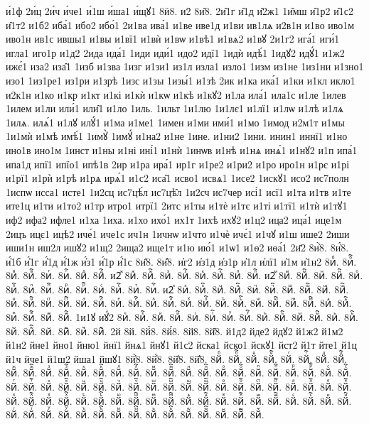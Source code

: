 {и́1ф
2и́ц
2и́ч
и́че1
и́1ш
и́ша1
и́щꙋ1
8ӥ8.
и2̑
8и̑8.
2и̑1г
и̑1д
и̑2ж1
1и̑мш
и̑1р2
и̑1с2
и̑1т2
и1б2
иба́1
ибо2
ибо́1
2и1ва
ива́1
и1ве
иве1д
и1ви
ив1лѧ
и2в1н
и1во
иво1м
иво1н
ив1с
ившы1
и1вы
и1вї1
и1вѝ
и1вѡ
и1вѣ1
и1вѧ2
и1вꙋ
2и1г2
ига́1
иги́1
игла1
иго1р
и1д2
2ида
ида́1
1иди
иди́1
идо2
идї1
1идѝ
идѣ́1
1идꙋ2
идꙋ́1
и1ж2
ижє́1
иза2
иза̑1
1изб
и1зва
1изг
и1зи1
из1л
изла1
изло1
1изм
из1не
1из1ни
и1зно1
изо1
1из1ре1
из1ри
и1зрѣ
1изс
и1зы
1изы́1
и1зѣ
2ик
и1ка
ика́1
и1ки
и1кл
икло1
и2к1н
и1ко
и1кр
и1кт
и1кі
и1кѝ
и1кѡ
и1кѣ
и1кꙋ2
и1ла
ила́1
ила1с
и1ле
1илев
1илем
и1ли
или́1
или̑1
и1ло
1иль.
1ильт
1и1лю
1и1лє1
и1лї1
и1лѡ
и1лѣ
и1лѧ
1илѧ.
илѧ́1
и1лꙋ
илꙋ́1
и1ма
и1ме1
1имен
и1ми
ими́1
и1мо
1имод
и2м1т
и1мы
1и1мѝ
и1мѣ
имѣ́1
1имꙋ̀
1имꙋ́
и1на2
и1не
1ине.
и1ни2
1ини.
инин1
иннї1
и1но
ино1в
ино1м
1инст
и1ны
и1ні
ині́1
и1нѝ
1инѡв
и1нѣ
и1нѧ
инѧ́1
и1нꙋ2
и1п
ипа́1
ипа1д
ипї1
ипїо1
ипѣ1в
2ир
и1ра
ира́1
ир1г
и1ре2
и1ри2
и1ро
иро1н
и1рє
и1рі
и1рї1
и1рѝ
и1рѣ
и1рѧ
ирѧ́1
и1с2
иса̑1
исво1
исвѧ1
1исе2
1искꙋ1
исо2
ис7полн
1испѡ
исса1
исте1
1и2сц
ис7цѣ́л
ис7цѣ̑л
1и2сч
ис7чер
исі́1
исї1
и1та
и1тв
и1те
ите1ц
и1ти
и1то2
и1тр
итро1
итрї1
2итс
и1ты
и1тѐ
и1тє
и1ті
и1тї1
и1тѝ
и1тꙋ1
иф2
ифа2
ифле1
и1ха
1иха.
и1хо
ихо́1
их1т
1ихѣ
ихꙋ2
и1ц2
ица2
ица́1
ице1м
2ицъ
ицє1
ицѣ2
иче́1
иче1с
ич1н
1ичнѡ
и1что
и1чѐ
ичє́1
и1чꙋ
и1ш
ише2
2иши
иши1н
иш2л
ишꙋ2
и1щ2
2ища2
ище1т
и1ю
ию́1
и1ѡ1
и1ѳ2
иѳа́1
2и҃2
8и҆̀8.
8и҆́8.
и҆́1б
и҆́1г
и҆́1д
и҆́1ж
и҆́з1
и҆́1р
и҆́1с
8и҆̈8.
8и҆̑8.
и҆г2
и҆з1д
и҆з1р
и҆1л
и҆лї1
и҆1м
и҆1н2
8иⷠ.
8иⷠ҇.
8иⷡ.
8иⷡ҇.
8иⷢ.
8иⷢ҇.
8иⷣ.
8иⷣ҇.
и2ⷤ
8иⷤ.
8иⷤ҇.
8иⷥ.
8иⷥ҇.
8иⷦ.
8иⷦ҇.
8иⷧ.
8иⷧ҇.
и2ⷨ
8иⷨ.
8иⷨ҇.
8иⷩ.
8иⷩ҇.
8иⷪ.
8иⷪ҇.
8иⷫ.
8иⷫ҇.
8иⷬ.
8иⷬ҇.
8иⷭ.
8иⷭ҇.
8иⷮ.
8иⷮ҇.
и2ⷯ
8иⷯ.
8иⷯ҇.
8иⷰ.
8иⷰ҇.
8иⷱ.
8иⷱ҇.
8иⷲ.
8иⷲ҇.
8иⷳ.
8иⷳ҇.
8иⷴ.
8иⷴ҇.
8иⷵ.
8иⷵ҇.
8иⷶ.
8иⷶ҇.
8иⷷ.
8иⷷ҇.
8иⷸ.
8иⷸ҇.
8иⷹ.
8иⷹ҇.
8иⷺ.
8иⷺ҇.
8иⷻ.
8иⷻ҇.
8иⷼ.
8иⷼ҇.
8иⷽ.
8иⷽ҇.
8иⷾ.
8иⷾ҇.
8иⷿ.
8иⷿ҇.
1и1ꙋ
иꙋ́2
8иꙴ.
8иꙴ҇.
8иꙵ.
8иꙵ҇.
8иꙶ.
8иꙶ҇.
8иꙷ.
8иꙷ҇.
8иꙸ.
8иꙸ҇.
8иꙹ.
8иꙹ҇.
8иꙺ.
8иꙺ҇.
8иꙻ.
8иꙻ҇.
8и꙼.
8и꙼҇.
8и꙽.
8и꙽҇.
2й
8й.
8й̀8.
8й́8.
8й̈8.
8й̑8.
й1д2
йде2
йдꙋ2
й1ж2
й1м2
й1н2
йне1
йно1
йню1
йнї1
йнѧ1
йнꙋ1
й1с2
йска1
йско1
йскꙋ1
йст2
й1т
йте1
й1ц
й1ч
йче1
й1ш2
йша1
йшꙋ1
8й҆̀8.
8й҆́8.
8й҆̈8.
8й҆̑8.
8йⷠ.
8йⷠ҇.
8йⷡ.
8йⷡ҇.
8йⷢ.
8йⷢ҇.
8йⷣ.
8йⷣ҇.
8йⷤ.
8йⷤ҇.
8йⷥ.
8йⷥ҇.
8йⷦ.
8йⷦ҇.
8йⷧ.
8йⷧ҇.
8йⷨ.
8йⷨ҇.
8йⷩ.
8йⷩ҇.
8йⷪ.
8йⷪ҇.
8йⷫ.
8йⷫ҇.
8йⷬ.
8йⷬ҇.
8йⷭ.
8йⷭ҇.
8йⷮ.
8йⷮ҇.
8йⷯ.
8йⷯ҇.
8йⷰ.
8йⷰ҇.
8йⷱ.
8йⷱ҇.
8йⷲ.
8йⷲ҇.
8йⷳ.
8йⷳ҇.
8йⷴ.
8йⷴ҇.
8йⷵ.
8йⷵ҇.
8йⷶ.
8йⷶ҇.
8йⷷ.
8йⷷ҇.
8йⷸ.
8йⷸ҇.
8йⷹ.
8йⷹ҇.
8йⷺ.
8йⷺ҇.
8йⷻ.
8йⷻ҇.
8йⷼ.
8йⷼ҇.
8йⷽ.
8йⷽ҇.
8йⷾ.
8йⷾ҇.
8йⷿ.
8йⷿ҇.
8йꙴ.
8йꙴ҇.
8йꙵ.
8йꙵ҇.
8йꙶ.
8йꙶ҇.
8йꙷ.
8йꙷ҇.
8йꙸ.
8йꙸ҇.
8йꙹ.
8йꙹ҇.
8йꙺ.
8йꙺ҇.
8йꙻ.
8йꙻ҇.
8й꙼.
8й꙼҇.
8й꙽.
}
